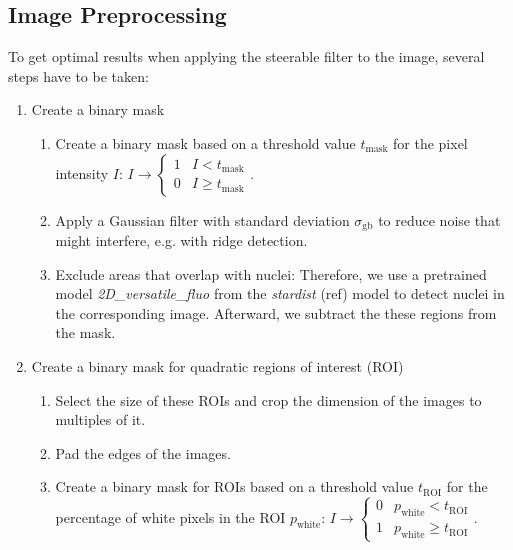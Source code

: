 \documentclass[a1,portrait]{a0poster}
\begin{document}
\begin{multicols}{2}
\section*{Image Preprocessing}
To get optimal results when applying the steerable filter to the image, several steps have to be taken:
\begin{enumerate}
    \item Create a binary mask
    \begin{enumerate}
        \item Create a binary mask based on a threshold value \(t_{\text{mask}}\) for the pixel intensity \(I\): \(I \to 
        \begin{cases}
            1 & I<t_{\text{mask}}\\
            0 & I \geq t_{\text{mask}}
        \end{cases}\).
        \item Apply a Gaussian filter with standard deviation \(\sigma_{\text{gb}}\) to reduce noise that might interfere, e.g. with ridge detection.
        \item Exclude areas that overlap with nuclei: Therefore, we use a pretrained model \textit{2D\_versatile\_fluo} from the \textit{stardist} (ref) model to detect nuclei in the corresponding image. Afterward, we subtract the these regions from the mask.
    \end{enumerate}
    \begin{minipage}{0.5\textwidth}
        
    \end{minipage}
    \item Create a binary mask for quadratic regions of interest (ROI)
    \begin{enumerate}
        \item Select the size of these ROIs and crop the dimension of the images to multiples of it.
        \item Pad the edges of the images.
        \item Create a binary mask for ROIs based on a threshold value \(t_{\text{ROI}}\) for the percentage of white pixels in the ROI \(p_{\text{white}}\):
        \(I \to 
        \begin{cases}
            0 & p_{\text{white}} < t_{\text{ROI}}\\
            1 & p_{\text{white}} \geq t_{\text{ROI}}
        \end{cases}
        \).
    \end{enumerate}
        \begin{minipage}{0.5\textwidth}
        
    \end{minipage}
\end{enumerate}

\clearpage

\end{multicols}
\end{document}
